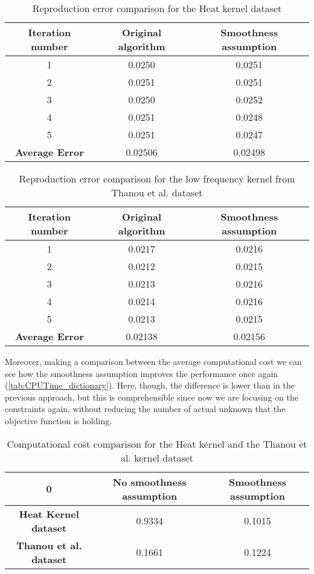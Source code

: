 \begin{table}[htbp]
  \centering
  \begin{tabular}{c|c|c}
    \multicolumn{1}{c|}{\textbf{Iteration number}} &
    \multicolumn{1}{c}{\textbf{Original algorithm}} &
    \multicolumn{1}{|c}{\textbf{Smoothness assumption}}\\
    \hline
    1 & 0.0250 & 0.0251\\
    2 & 0.0251 & 0.0251\\
    3 & 0.0250 & 0.0252\\
    4 & 0.0251 & 0.0248\\
    5 & 0.0251 & 0.0247\\
    \textbf{Average Error} & 0.02506 & 0.02498
  \end{tabular}
  \caption{Reproduction error comparison for the Heat kernel dataset}
  \label{tab:errorHeat}
\end{table}

\begin{table}[htbp]
  \centering
  \begin{tabular}{c|c|c}
    \multicolumn{1}{c|}{\textbf{Iteration number}} &
    \multicolumn{1}{c}{\textbf{Original algorithm}} &
    \multicolumn{1}{|c}{\textbf{Smoothness assumption}}\\
    \hline
    1 & 0.0217 & 0.0216\\
    2 & 0.0212 & 0.0215\\
    3 & 0.0213 & 0.0216\\
    4 & 0.0214 & 0.0216\\
    5 & 0.0213 & 0.0215\\
    \textbf{Average Error} & 0.02138 & 0.02156
  \end{tabular}
  \caption{Reproduction error comparison for the low frequency kernel from Thanou et al. dataset}
  \label{tab:errorDorina}
\end{table}

Moreover, making a comparison between the average computational cost we can see how the smoothness assumption improves the performance once again (\autoref{tab:CPUTime_dictionary}). Here, though, the difference is lower than in the previous approach, but this is comprehensible since now we are focusing on the constraints again, without reducing the number of actual unknown that the objective function is holding.

\begin{table}[htbp]
  \centering
  \begin{tabular}{c|c|c}
    0 &
    \multicolumn{1}{c}{\textbf{No smoothness assumption}} &
    \multicolumn{1}{|c}{\textbf{Smoothness assumption}}\\
    \hline
    \textbf{Heat Kernel dataset} & 0.9334 & 0.1015\\
    \textbf{Thanou et al. dataset} & 0.1661 & 0.1224 \\
  \end{tabular}
  \caption{Computational cost comparison for the Heat kernel and the Thanou et al. kernel dataset}
  \label{tab:CPUTime_dictionary}
\end{table}

